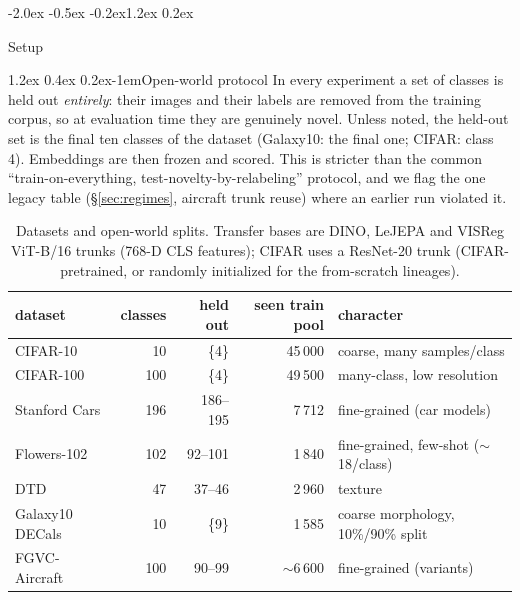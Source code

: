 \documentclass{article}
\makeatletter
\renewcommand\section{\@startsection{section}{1}{\z@}%
  {-2.0ex \@plus -0.5ex \@minus -0.2ex}{1.2ex \@plus 0.2ex}%
  {\large\bf\raggedright}}
\renewcommand\paragraph{\@startsection{paragraph}{4}{\z@}%
  {1.2ex \@plus 0.4ex \@minus 0.2ex}{-1em}{\normalsize\bf}}
\makeatother
\begin{document}
\section{Setup}

\paragraph{Open-world protocol}
In every experiment a set of classes is held out \emph{entirely}: their images
and their labels are removed from the training corpus, so at evaluation time
they are genuinely novel. Unless noted, the held-out set is the final ten
classes of the dataset (Galaxy10: the final one; CIFAR: class 4). Embeddings
are then frozen and scored. This is stricter than the common
``train-on-everything, test-novelty-by-relabeling'' protocol, and we flag the
one legacy table (\S\ref{sec:regimes}, aircraft trunk reuse) where an earlier
run violated it.

\begin{table}[t]\centering\small
\begin{tabular}{lrrrl}
\toprule
dataset & classes & held out & seen train pool & character \\
\midrule
CIFAR-10 & 10 & \{4\} & 45\,000 & coarse, many samples/class \\
CIFAR-100 & 100 & \{4\} & 49\,500 & many-class, low resolution \\
Stanford Cars & 196 & 186--195 & 7\,712 & fine-grained (car models) \\
Flowers-102 & 102 & 92--101 & 1\,840 & fine-grained, few-shot ($\sim$18/class) \\
DTD & 47 & 37--46 & 2\,960 & texture \\
Galaxy10 DECals & 10 & \{9\} & 1\,585 & coarse morphology, 10\%/90\% split \\
FGVC-Aircraft & 100 & 90--99 & $\sim$6\,600 & fine-grained (variants) \\
\bottomrule
\end{tabular}
\caption{Datasets and open-world splits. Transfer bases are DINO, LeJEPA and
VISReg ViT-B/16 trunks (768-D CLS features); CIFAR uses a ResNet-20 trunk
(CIFAR-pretrained, or randomly initialized for the from-scratch lineages).}
\label{tab:datasets}
\end{table}
\end{document}
